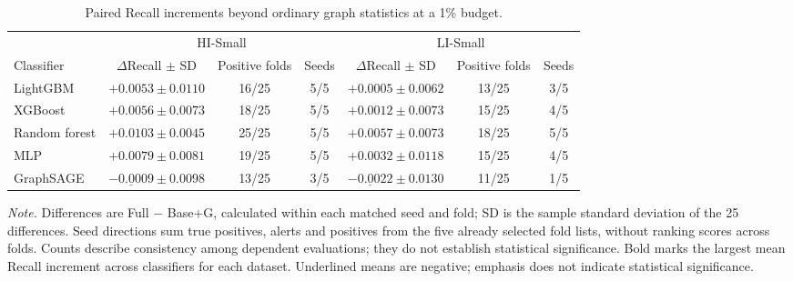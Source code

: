 \begin{table}[htbp]
\centering
\footnotesize
\setlength{\tabcolsep}{4pt}
\caption{Paired Recall increments beyond ordinary graph statistics at a 1\% budget.}
\label{tab:budgetpaired}
\begin{threeparttable}
\begin{tabular}{lcccccc}
\toprule
& \multicolumn{3}{c}{HI-Small} & \multicolumn{3}{c}{LI-Small} \\
\cmidrule(lr){2-4}\cmidrule(lr){5-7}
Classifier & $\Delta$Recall $\pm$ SD & Positive folds & Seeds & $\Delta$Recall $\pm$ SD & Positive folds & Seeds \\
\midrule
LightGBM & $+0.0053 \pm 0.0110$ & 16/25 & 5/5 & $+0.0005 \pm 0.0062$ & 13/25 & 3/5 \\
XGBoost & $+0.0056 \pm 0.0073$ & 18/25 & 5/5 & $+0.0012 \pm 0.0073$ & 15/25 & 4/5 \\
Random forest & $\mathbf{+0.0103} \pm 0.0045$ & 25/25 & 5/5 & $\mathbf{+0.0057} \pm 0.0073$ & 18/25 & 5/5 \\
MLP & $+0.0079 \pm 0.0081$ & 19/25 & 5/5 & $+0.0032 \pm 0.0118$ & 15/25 & 4/5 \\
GraphSAGE & $\underline{-0.0009} \pm 0.0098$ & 13/25 & 3/5 & $\underline{-0.0022} \pm 0.0130$ & 11/25 & 1/5 \\
\bottomrule
\end{tabular}
\begin{tablenotes}[flushleft]
\footnotesize
\setlength{\labelsep}{0pt}\item[] \textit{Note.} Differences are Full $-$ Base+G, calculated within each matched seed and fold; SD is the sample standard deviation of the 25 differences. Seed directions sum true positives, alerts and positives from the five already selected fold lists, without ranking scores across folds. Counts describe consistency among dependent evaluations; they do not establish statistical significance. Bold marks the largest mean Recall increment across classifiers for each dataset. Underlined means are negative; emphasis does not indicate statistical significance.
\end{tablenotes}
\end{threeparttable}
\end{table}
